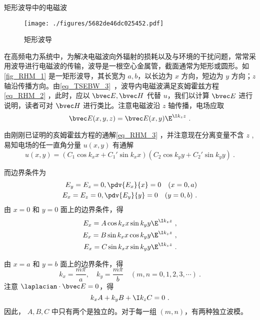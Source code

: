 \begin{example}{矩形波导中的电磁波}
\begin{figure}[ht]
\centering
\texttt{[image: ./figures/5682de46dc025452.pdf]}
\caption{矩形波导} \label{fig_RHM_1}
\end{figure}
在高频电力系统中，为解决电磁波向外辐射的损耗以及与环境的干扰问题，常常采用波导进行电磁波的传输，波导是一根空心金属管，截面通常为矩形或圆形。如\autoref{fig_RHM_1} 是一矩形波导，其长宽为 $a,b$，以长边为 $x$ 方向，短边为 $y$ 方向；$z$ 轴沿传播方向。由\autoref{eq_TSEBW_3}~，波导内电磁波满足亥姆霍兹方程\autoref{eq_RHM_2} ，此时，应以 $\bvec E,\bvec H$ 代替 $u$，我们以计算 $\bvec E$ 进行说明，读者可对 $\bvec H$ 进行类比。注意电磁波沿 $z$ 轴传播，电场应取
\begin{equation}
\bvec E(x,y,z)=\bvec E(x,y)\E^{\I k_z z}~.
\end{equation}

由刚刚已证明的亥姆霍兹方程的通解\autoref{eq_RHM_3} ，并注意现在分离变量不含 $z$ ,易知电场的任一直角分量 $u(x,y)$ 有通解
\begin{equation}
u(x,y)=(C_1\cos k_xx+C_1'\sin k_xx)(C_2\cos k_yy+C_2'\sin k_yy)~.
\end{equation}

而边界条件为
\begin{equation}
\begin{aligned}
E_y=E_z=0,\pdv{E_x}{x}=0\quad(x=0,a)\\
E_x=E_z=0,\pdv{E_y}{y}=0\quad(y=0,b)~.
\end{aligned}
\end{equation}
由 $x=0$ 和 $y=0$ 面上的边界条件，得
\begin{equation}\begin{aligned}
E_x=A\cos k_x x\sin k_yy\E^{\I k_zz}~, \\
E_x=B\sin k_x x\cos k_yy\E^{\I k_zz}~, \\
E_x=C\sin k_x x\sin k_yy\E^{\I k_zz}~.
\end{aligned}\end{equation}
 
由 $x=a$ 和 $y=b$ 面上的边界条件，得 
\begin{equation}
k_x=\frac{m\pi}{a},\quad k_y=\frac{m\pi}{b}\quad(m,n=0,1,2,3,\cdots)~.
\end{equation}
注意 $\laplacian \cdot\bvec E=0$，得
\begin{equation}
k_xA+k_yB+\I k_zC=0~.
\end{equation}
因此， $A,B,C$ 中只有两个是独立的。对于每一组 $(m,n)$，有两种独立波模。
\end{example}
